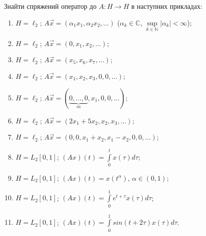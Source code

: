 \begin{exercise}
    Знайти спряжений оператор до $A: H\rightarrow H$ в наступних 
    прикладах:
    \begin{enumerate}[label=\ukr*)]
        \item $H = \ell_2$; $A\vec{x} = (\alpha_1x_1, \alpha_2x_2, ...)$
        ($\alpha_k \in \mathbb{C}$, $\underset{k \in \mathbb{N}}{\sup}|\alpha_k| < \infty$);
        \item $H = \ell_2$; $A\vec{x} = (0, x_1, x_2, ...)$;
        \item $H = \ell_2$; $A\vec{x} = (x_5, x_6, x_7, ...)$;
        \item $H = \ell_2$; $A\vec{x} = (x_1, x_2, x_3,0,0,...)$;
        \item $H = \ell_2$; $A\vec{x} = (\underbrace{0,...,0}_m, 
        x_1, 0, 0, ...)$;
        \item $H = \ell_2$; $A\vec{x} = (2x_1 + 5x_2, x_2, x_3, ...)$;
        \item $H = \ell_2$; $A\vec{x} = (0, 0, x_1 + x_2, x_1 - x_2, 0,  
        0, ...)$;
        \item $H = L_2[0,1]$; $(Ax)(t) = \int\limits_0^t x(\tau) d\tau$;
        \item $H = L_2[0,1]$; $(Ax)(t) = x(t^\alpha)$, $\alpha \in (0,1)$;
        \item $H = L_2[0,1]$; $(Ax)(t) = \int\limits_0^1 e^{t+\tau}x(\tau) 
        d\tau$;
        \item $H = L_2[0,1]$; $(Ax)(t) = \int\limits_0^1 
        sin(t+2\tau) x(\tau) d\tau$.
    \end{enumerate}
\end{exercise}